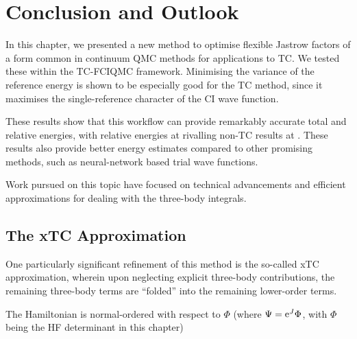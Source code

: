 \section{Conclusion and Outlook}

In this chapter, we presented a new method to optimise flexible Jastrow factors of a form common in continuum QMC methods for applications to TC. We tested these within the TC-FCIQMC framework. Minimising the variance of the reference energy is shown to be especially good for the TC method, since it maximises the single-reference character of the CI wave function.

These results show that this workflow can provide remarkably accurate total and relative energies, with relative energies at \vtz rivalling non-TC results at . These results also provide better energy estimates compared to other promising methods, such as neural-network based trial wave functions.\supercite{pfauInitio2020,hermannDeepneuralnetwork2020}

Work pursued on this topic have focused on technical advancements and efficient approximations for dealing with the three-body integrals.

\subsection{The xTC Approximation}
\label{sec:xtc}

One particularly significant refinement of this method is the so-called \gls{xTC} approximation,\supercite{christlmaierXTC2023} wherein upon neglecting explicit three-body contributions, the remaining three-body terms are ``folded'' into the remaining lower-order terms.

The Hamiltonian is normal-ordered with respect to $\Phi$ (where $\Psi=\mathrm{e}^J\Phi$, with $\Phi$ being the HF determinant in this chapter)\supercite{kutzelniggNormal1997,kutzelniggCumulant1999}

